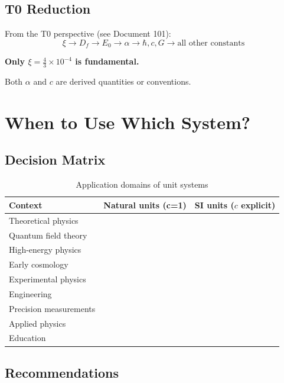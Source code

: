	\subsection{T0 Reduction}
	
	From the T0 perspective (see Document 101):
	\begin{equation}
		\xi \to D_f \to E_0 \to \alpha \to \hbar, c, G \to \text{all other constants}
	\end{equation}
	
	\textbf{Only $\xi = \frac{4}{3} \times 10^{-4}$ is fundamental.}
	
	Both $\alpha$ and $c$ are derived quantities or conventions.
	
	\section{When to Use Which System?}
	
	\subsection{Decision Matrix}
	
	\begin{table}[h]
		\centering
		\begin{tabular}{|l|c|c|}
			\hline
			\textbf{Context} & \textbf{Natural units (c=1)} & \textbf{SI units ($c$ explicit)} \\
			\hline
			Theoretical physics & \checkmark & \\
			Quantum field theory & \checkmark & \\
			High-energy physics & \checkmark & \\
			Early cosmology & \checkmark & \\
			\hline
			Experimental physics & & \checkmark \\
			Engineering & & \checkmark \\
			Precision measurements & & \checkmark \\
			Applied physics & & \checkmark \\
			Education & & \checkmark \\
			\hline
		\end{tabular}
		\caption{Application domains of unit systems}
	\end{table}
	
	\subsection{Recommendations}
	

